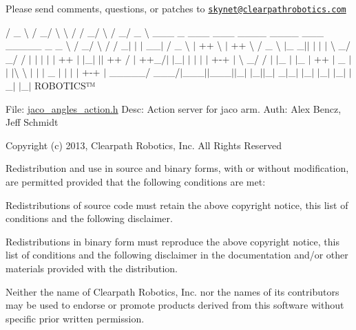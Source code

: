 Please send comments, questions, or patches to \href{mailto:skynet@clearpathrobotics.com}{\tt skynet@clearpathrobotics.\+com}



 / \+\_\+ \textbackslash{} / \+\_\+/ \textbackslash{} \textbackslash{} / / \+\_\+/ \textbackslash{} / \+\_\+/ \+\_\+ \textbackslash{} \+\_\+\+\_\+\+\_\+ \+\_\+ \+\_\+\+\_\+\+\_\+ \+\_\+\+\_\+\+\_\+ \+\_\+\+\_\+\+\_\+\+\_\+ \+\_\+\+\_\+\+\_\+\+\_\+ \+\_\+\+\_\+\+\_\+ \+\_\+\+\_\+\+\_\+\+\_\+\+\_\+ \+\_\+ \+\_\+ \textbackslash{} / \+\_\+/ \textbackslash{} / / \+\_\+$|$ $\vert$ $\vert$ \+\_\+\+\_\+$\vert$ / \+\_\+ \textbackslash{} $\vert$ ++ \textbackslash{} $\vert$ ++ \textbackslash{} / \+\_\+ \textbackslash{} $\vert$\+\_\+ \+\_\+$\vert$$\vert$ $\vert$ $\vert$ $\vert$ \textbackslash{} \+\_\+/ \+\_\+/ / $\vert$ $\vert$ $\vert$ $\vert$ $\vert$ ++ $\vert$ $\vert$\+\_\+$\vert$ $\vert$$\vert$ ++ / $\vert$ ++\+\_\+/$\vert$ $\vert$\+\_\+$\vert$ $\vert$ $\vert$ $\vert$ $\vert$ +-\/+ $\vert$ \textbackslash{} \+\_\+/ / $\vert$ $\vert$\+\_\+ $\vert$ $\vert$\+\_\+ $\vert$ ++ $\vert$ \+\_\+ $\vert$$\vert$ $\vert$\textbackslash{} \textbackslash{} $\vert$ $\vert$ $\vert$ \+\_\+ $\vert$ $\vert$ $\vert$ $\vert$ +-\/+ $\vert$ \+\_\+\+\_\+\+\_\+\+\_\+\+\_\+/ \+\_\+\+\_\+\+\_\+/$\vert$\+\_\+\+\_\+\+\_\+$\vert$$\vert$\+\_\+\+\_\+\+\_\+$\vert$$\vert$\+\_\+$\vert$ $\vert$\+\_\+$\vert$$\vert$\+\_\+$\vert$ \+\_\+$|$\+\_\+$\vert$ $\vert$\+\_\+$\vert$ $\vert$\+\_\+$\vert$ $\vert$\+\_\+$\vert$ $\vert$\+\_\+$\vert$ $\vert$\+\_\+$\vert$ R\+O\+B\+O\+T\+I\+C\+S™

File\+: \hyperlink{jaco__angles__action_8h}{jaco\+\_\+angles\+\_\+action.\+h} Desc\+: Action server for jaco arm. Auth\+: Alex Bencz, Jeff Schmidt

Copyright (c) 2013, Clearpath Robotics, Inc. All Rights Reserved

Redistribution and use in source and binary forms, with or without modification, are permitted provided that the following conditions are met\+:
\begin{DoxyItemize}
\item Redistributions of source code must retain the above copyright notice, this list of conditions and the following disclaimer.
\item Redistributions in binary form must reproduce the above copyright notice, this list of conditions and the following disclaimer in the documentation and/or other materials provided with the distribution.
\item Neither the name of Clearpath Robotics, Inc. nor the names of its contributors may be used to endorse or promote products derived from this software without specific prior written permission.
\end{DoxyItemize}

